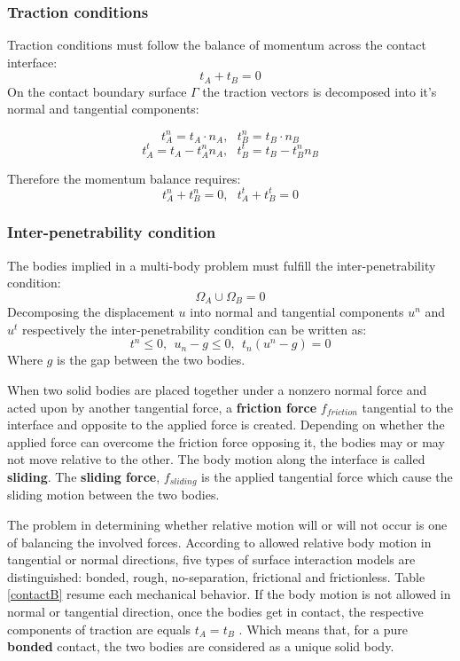   \subsubsection*{Traction conditions}
  Traction conditions must follow the balance of momentum across the contact interface:
  \begin{equation}
  t_A + t_B=0
\end{equation}
On the contact boundary surface $\Gamma$ the traction vectors is decomposed into it's normal and tangential components:

$$t_A^n = t_A \cdot n_A,  \ \ \ t_B^n = t_B \cdot n_B$$
$$t_A^t = t_A - t_A^n n_A, \ \ \ t_B^t = t_B - t_B^n n_B$$

Therefore the momentum balance requires:
\begin{equation} 
t_A^n + t_B^n = 0, \ \ \ t_A^t + t_B^t = 0
\end{equation} 

 \subsubsection*{Inter-penetrability condition}
The bodies implied in a multi-body problem must fulfill the inter-penetrability condition:
\begin{equation}
\Omega_A \cup \Omega_B = 0
\end{equation}
Decomposing the displacement $u$ into normal and tangential components $u^n$ and $u^t$ respectively the inter-penetrability condition can be written as:
\begin{equation}
t^n \leq 0, \ \ u_n-g \leq 0, \ \ t_n(u^n-g) = 0
\end{equation}
 Where $g$ is the gap between the two bodies.

%

\label{subsection:surfaceinteractionmodels}
When two solid bodies are placed together under a nonzero normal force and acted upon by another tangential force, a \textbf{friction force} $f_{friction}$ tangential to the interface and opposite to the applied force is created. Depending on whether the applied force can overcome the friction force opposing it, the bodies may or may not move relative to the other. The body motion along the interface is called \textbf{sliding}. The \textbf{sliding force}, $f_{sliding}$ is the applied tangential force which cause the sliding motion between the two bodies.
  
The problem in determining whether relative motion will or will not occur is one of balancing the involved forces. According to allowed relative body motion in tangential or normal directions, five types of surface interaction models are distinguished: bonded, rough, no-separation, frictional and frictionless. Table \ref{contactB} resume each mechanical behavior. If the body motion is not allowed in normal or tangential direction, once the bodies get in contact, the respective components of traction are equals $t_A=t_B$ . Which means that, for a pure \textbf{bonded} contact, the two bodies are considered as a unique solid body.    

